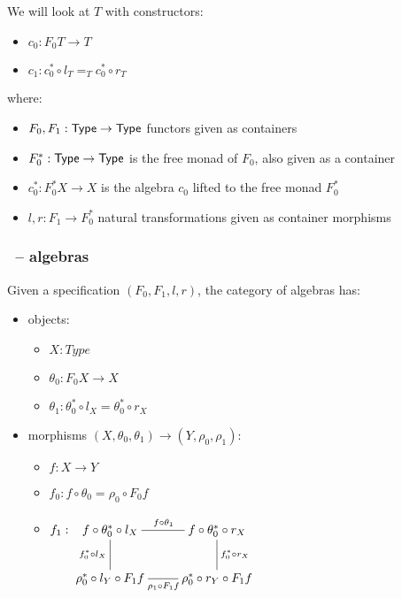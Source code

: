 \documentclass{beamer}
\begin{document}
\begin{frame}[noframenumbering]
  \frametitle{\onehits}
   
   We will look at \onehits $T$ with constructors:
   
   \begin{itemize}
   \item $c_0 : F_0 T \to T$
   \item $c_1 : c_0^* \circ l_T =_T c_0^* \circ r_T$
   \end{itemize}

   where:

   \begin{itemize}
  \item $F_0, F_1 : \mathsf{Type} \to \mathsf{Type}$ functors given as containers
  \item $F_0^* : \mathsf{Type} \to \mathsf{Type}$ is the free monad of $F_0$, also given as a container
  \item $c_0^* : F_0^* X \to X$ is the algebra $c_0$ lifted to the free monad $F_0^*$
  \item $l, r : F_1 \to F_0^*$ natural transformations given as container morphisms
   \end{itemize}

 \end{frame}

 \begin{frame}
   \frametitle{\onehits\ -- algebras}
   
   Given a specification $(F_0,F_1, l, r)$, the category of algebras has:

   \begin{itemize}
   \item objects:
     \begin{itemize}
     \item $X : Type$
     \item $\theta_0 : F_0 X \to X$
     \item $\theta_1 : \theta_0^* \circ l_X = \theta_0^* \circ r_X$
     \end{itemize}
   \item morphisms $(X,\theta_0,\theta_1) \to (Y,\rho_0,\rho_1)$:
     \begin{itemize}
     \item $f : X \to Y$ 
     \item $f_0 : f \circ \theta_0 = \rho_0 \circ F_0 f$
     \item $f_1 : \xymatrix{ f \circ \theta_0^* \circ l_X \ar@{-}[r]^{f
           \circ \theta_1} \ar@{-}[d]_{f_0^* \circ l_X} &f \circ
         \theta_0^* \circ r_X \ar@{-}[d]^{f_0^* \circ r_X}
         \\
         \rho_0^* \circ l_Y \circ F_1 f \ar@{-}[r]_{\rho_1 \circ F_1 f} &\rho_0^* \circ r_Y
         \circ F_1 f }$
     \end{itemize}
   \end{itemize}
 \end{frame}
\end{document}
